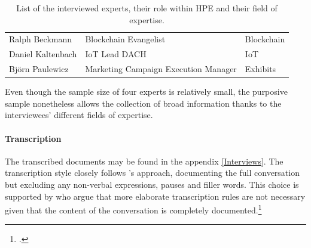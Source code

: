 \begin{table}[]  
    \centering
    \begin{tabular}{l|l|l}
        Ralph Beckmann & Blockchain Evangelist & Blockchain \\
        Daniel Kaltenbach & IoT Lead DACH & IoT \\
        Björn Paulewicz & Marketing Campaign Execution Manager & Exhibits \\
    \end{tabular}
    \caption{List of the interviewed experts, their role within HPE and their field of expertise.}
    \label{tab:Experts}
\end{table}

Even though the sample size of four experts is relatively small, the purposive sample nonetheless allows the collection of broad information thanks to the interviewees' different fields of expertise.  

\paragraph{Transcription} The transcribed documents may be found in the appendix \ref{Interviews}. The transcription style closely follows \cite{KrugerqualitativeInhaltsanalyseMethode2004}'s approach, documenting the full conversation but excluding any non-verbal expressions, pauses and filler words. This choice is supported by \cite{MeuserExpertInneninterviewsvielfacherprobt1991} who argue that more elaborate transcription rules are not necessary given that the content of the conversation is completely documented.\footcite[Cf.][p.456]{MeuserExpertInneninterviewsvielfacherprobt1991}

